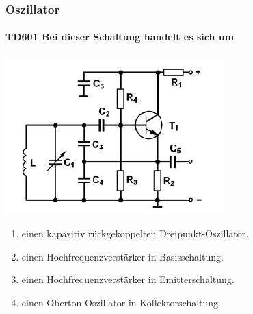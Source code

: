 \documentclass[8pt]{article}
\begin{document}
\begin{enumerate}
\begin{enumerate}[nolistsep,label=\Alph*]
\pagebreak
\subsubsection{Oszillator}
\paragraph*{TD601 Bei dieser Schaltung handelt es sich um} 
\begin{center}
	\begin{minipage}{\linewidth}
		\centering
		\includegraphics[scale=1.0]{pics/td601_a.jpg}
	\end{minipage}
\end{center}
\begin{enumerate}[nolistsep,label=\Alph*]
\item einen kapazitiv rückgekoppelten Dreipunkt-Oszillator.
\item einen Hochfrequenzverstärker in Basisschaltung.
\item einen Hochfrequenzverstärker in Emitterschaltung.
\item einen Oberton-Oszillator in Kollektorschaltung.
\end{enumerate}


\end{enumerate}
\end{enumerate}
\end{document}

